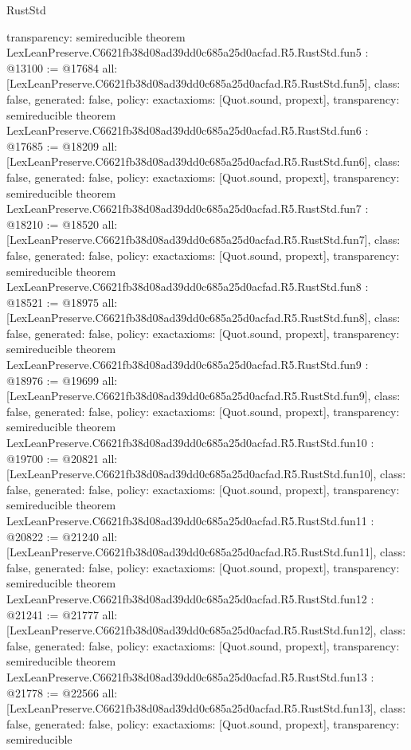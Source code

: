 \begin{lexlean}{RustStd}
\begin{coremodule}
{  transparency: semireducible
}
theorem LexLeanPreserve.C6621fb38d08ad39dd0c685a25d0acfad.R5.RustStd.fun5 : @13100 := @17684 {
  all: [LexLeanPreserve.C6621fb38d08ad39dd0c685a25d0acfad.R5.RustStd.fun5],
  class: false,
  generated: false,
  policy: exact{axioms: [Quot.sound, propext]},
  transparency: semireducible
}
theorem LexLeanPreserve.C6621fb38d08ad39dd0c685a25d0acfad.R5.RustStd.fun6 : @17685 := @18209 {
  all: [LexLeanPreserve.C6621fb38d08ad39dd0c685a25d0acfad.R5.RustStd.fun6],
  class: false,
  generated: false,
  policy: exact{axioms: [Quot.sound, propext]},
  transparency: semireducible
}
theorem LexLeanPreserve.C6621fb38d08ad39dd0c685a25d0acfad.R5.RustStd.fun7 : @18210 := @18520 {
  all: [LexLeanPreserve.C6621fb38d08ad39dd0c685a25d0acfad.R5.RustStd.fun7],
  class: false,
  generated: false,
  policy: exact{axioms: [Quot.sound, propext]},
  transparency: semireducible
}
theorem LexLeanPreserve.C6621fb38d08ad39dd0c685a25d0acfad.R5.RustStd.fun8 : @18521 := @18975 {
  all: [LexLeanPreserve.C6621fb38d08ad39dd0c685a25d0acfad.R5.RustStd.fun8],
  class: false,
  generated: false,
  policy: exact{axioms: [Quot.sound, propext]},
  transparency: semireducible
}
theorem LexLeanPreserve.C6621fb38d08ad39dd0c685a25d0acfad.R5.RustStd.fun9 : @18976 := @19699 {
  all: [LexLeanPreserve.C6621fb38d08ad39dd0c685a25d0acfad.R5.RustStd.fun9],
  class: false,
  generated: false,
  policy: exact{axioms: [Quot.sound, propext]},
  transparency: semireducible
}
theorem LexLeanPreserve.C6621fb38d08ad39dd0c685a25d0acfad.R5.RustStd.fun10 : @19700 := @20821 {
  all: [LexLeanPreserve.C6621fb38d08ad39dd0c685a25d0acfad.R5.RustStd.fun10],
  class: false,
  generated: false,
  policy: exact{axioms: [Quot.sound, propext]},
  transparency: semireducible
}
theorem LexLeanPreserve.C6621fb38d08ad39dd0c685a25d0acfad.R5.RustStd.fun11 : @20822 := @21240 {
  all: [LexLeanPreserve.C6621fb38d08ad39dd0c685a25d0acfad.R5.RustStd.fun11],
  class: false,
  generated: false,
  policy: exact{axioms: [Quot.sound, propext]},
  transparency: semireducible
}
theorem LexLeanPreserve.C6621fb38d08ad39dd0c685a25d0acfad.R5.RustStd.fun12 : @21241 := @21777 {
  all: [LexLeanPreserve.C6621fb38d08ad39dd0c685a25d0acfad.R5.RustStd.fun12],
  class: false,
  generated: false,
  policy: exact{axioms: [Quot.sound, propext]},
  transparency: semireducible
}
theorem LexLeanPreserve.C6621fb38d08ad39dd0c685a25d0acfad.R5.RustStd.fun13 : @21778 := @22566 {
  all: [LexLeanPreserve.C6621fb38d08ad39dd0c685a25d0acfad.R5.RustStd.fun13],
  class: false,
  generated: false,
  policy: exact{axioms: [Quot.sound, propext]},
  transparency: semireducible
}
\end{coremodule}
\end{lexlean}
